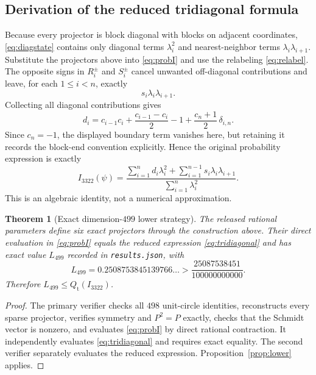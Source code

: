 \documentclass[11pt]{article}
\newtheorem{theorem}{Theorem}[section]
\newcommand{\1}{\mathbb{1}}
\newcommand{\Qt}{Q_{\mathrm t}}
\begin{document}
\subsection{Derivation of the reduced tridiagonal formula}\label{subsec:499derivation}
Because every projector is block diagonal with blocks on adjacent coordinates, \eqref{eq:diagstate} contains only diagonal terms $\lambda_i^2$ and nearest-neighbor terms $\lambda_i\lambda_{i+1}$.  Substitute the projectors above into \eqref{eq:probI} and use the relabeling \eqref{eq:relabel}.  The opposite signs in $R_i^\pm$ and $S_i^\pm$ cancel unwanted off-diagonal contributions and leave, for each $1\le i<n$, exactly
\[
s_i\lambda_i\lambda_{i+1}.
\]
Collecting all diagonal contributions gives
\begin{equation}\label{eq:diagonalcoefficient}
d_i=c_{i-1}c_i+\frac{c_{i-1}-c_i}{2}-1+\frac{c_n+1}{2}\,\delta_{i,n}.
\end{equation}
Since $c_n=-1$, the displayed boundary term vanishes here, but retaining it records the block-end convention explicitly.  Hence the original probability expression is exactly
\begin{equation}\label{eq:tridiagonal}
I_{3322}(\psi)=
\frac{\displaystyle\sum_{i=1}^n d_i\lambda_i^2+
\displaystyle\sum_{i=1}^{n-1}s_i\lambda_i\lambda_{i+1}}
{\displaystyle\sum_{i=1}^n\lambda_i^2}.
\end{equation}
This is an algebraic identity, not a numerical approximation.

\begin{theorem}[Exact dimension-$499$ lower strategy]\label{thm:l499}
The released rational parameters define six exact projectors through the construction above.  Their direct evaluation in \eqref{eq:probI} equals the reduced expression \eqref{eq:tridiagonal} and has exact value $L_{499}$ recorded in \texttt{results.json}, with
\[
L_{499}=0.2508753845139766\ldots>
\frac{25087538451}{100000000000}.
\]
Therefore $L_{499}\le\Qt(I_{3322})$.
\end{theorem}
\begin{proof}
The primary verifier checks all $498$ unit-circle identities, reconstructs every sparse projector, verifies symmetry and $P^2=P$ exactly, checks that the Schmidt vector is nonzero, and evaluates \eqref{eq:probI} by direct rational contraction.  It independently evaluates \eqref{eq:tridiagonal} and requires exact equality.  The second verifier separately evaluates the reduced expression.  Proposition~\ref{prop:lower} applies.
\end{proof}
\end{document}
